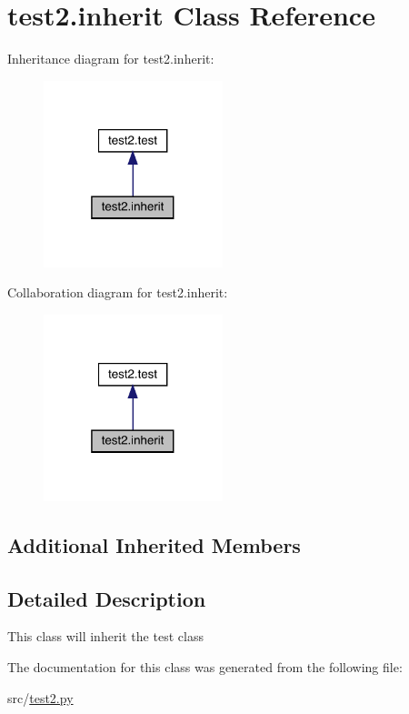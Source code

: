 \hypertarget{classtest2_1_1inherit}{}\section{test2.\+inherit Class Reference}
\label{classtest2_1_1inherit}


Inheritance diagram for test2.\+inherit\+:
\nopagebreak
\begin{figure}[H]
\begin{center}
\leavevmode
\includegraphics[width=148pt]{classtest2_1_1inherit__inherit__graph}
\end{center}
\end{figure}


Collaboration diagram for test2.\+inherit\+:
\nopagebreak
\begin{figure}[H]
\begin{center}
\leavevmode
\includegraphics[width=148pt]{classtest2_1_1inherit__coll__graph}
\end{center}
\end{figure}
\subsection*{Additional Inherited Members}


\subsection{Detailed Description}
\begin{DoxyVerb}This class will inherit the test class \end{DoxyVerb}
 

The documentation for this class was generated from the following file\+:\begin{DoxyCompactItemize}
\item 
src/\mbox{\hyperlink{test2_8py}{test2.\+py}}\end{DoxyCompactItemize}
